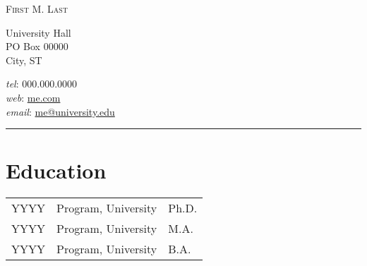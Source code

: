 \documentclass[11pt]{article}
\makeatletter
\newcommand{\myname}{First M. Last}     %
\newcommand{\websiteurl}{{https://github.com/btskinner/tex_cv}} %
\newcommand{\websitename}{me.com}       %
\newcommand{\phone}{000.000.0000}       %
\newcommand{\email}{me@university.edu}  %
\newcommand{\address}{                  %
  University Hall \\
  PO Box 00000 \\            
  City, ST
}
\newcommand{\RR}{\raggedright\arraybackslash} %
\newcommand{\RL}{\raggedleft\arraybackslash}  %
\makeatother
\begin{document}
\thispagestyle{first}


\hspace*{-\parindent}%
\begin{center}
  \vspace{-2em}
  {\LARGE\scshape \myname} \\
\end{center}
\begin{minipage}[t]{.6\linewidth}
\address
\end{minipage}
\hspace*{-\parindent}%
\begin{minipage}[t]{.43\linewidth}
\begin{flushright}
  \textit{tel}: \phone \\
  \textit{web}: \href{\websiteurl}{\websitename} \\
  \textit{email}: \href{mailto:\email}{\email}
\end{flushright}
\end{minipage}
\begin{center}
  \vspace{-.5em}
  \rule{\textwidth}{1pt}  
\end{center}





\section*{Education}
\begin{tabularx}{\linewidth}{>{\RR}p{1in}>{\RR}X>{\RL}p{1in}}
  YYYY&Program, University&Ph.D. \\ %
  YYYY&Program, University&M.A. \\
  YYYY&Program, University&B.A. \\
\end{tabularx}
\end{document}

